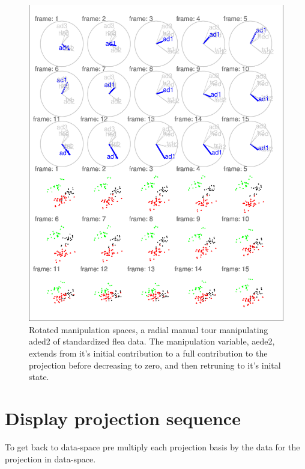 \documentclass{monashthesis}
\begin{document}
\begin{figure}
\centering
\includegraphics{thesis_files/figure-latex/step3-1.pdf}
\caption{\label{fig:step3}Rotated manipulation spaces, a radial manual tour
manipulating aded2 of standardized flea data. The manipulation variable,
aede2, extends from it's initial contribution to a full contribution to
the projection before decreasing to zero, and then retruning to it's
inital state.}
\end{figure}

\section{Display projection sequence}\label{display-projection-sequence}

To get back to data-space pre multiply each projection basis by the data
for the projection in data-space.
\end{document}
